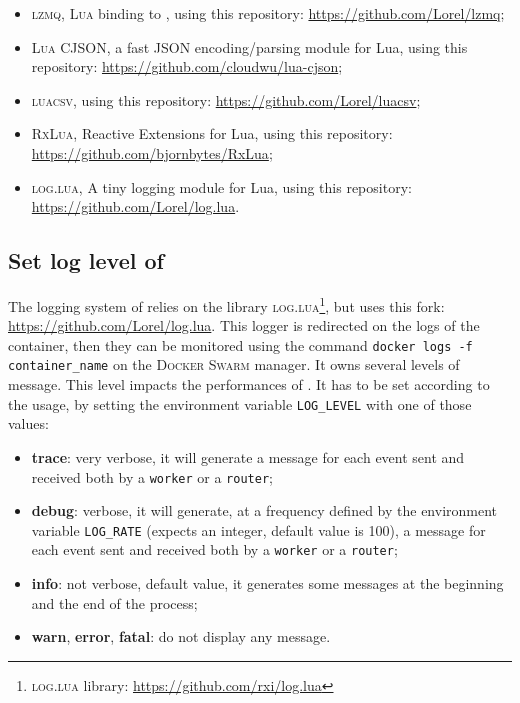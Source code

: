 \begin{itemize}
  \item \textsc{lzmq}, \textsc{Lua} binding to \zmq{}, using this repository: \url{https://github.com/Lorel/lzmq};
  \item \textsc{Lua CJSON}, a fast \textsc{JSON} encoding/parsing module for Lua, using this repository: \url{https://github.com/cloudwu/lua-cjson};
  \item \textsc{luacsv}, using this repository: \url{https://github.com/Lorel/luacsv};
  \item \textsc{RxLua}, Reactive Extensions for Lua, using this repository: \url{https://github.com/bjornbytes/RxLua};
  \item \textsc{log.lua}, A tiny logging module for Lua, using this repository: \url{https://github.com/Lorel/log.lua}.
\end{itemize}

\subsection{Set log level of \SS{}}
\label{subsec:ss-log-level}

The logging system of \SS{} relies on the library \textsc{log.lua}\footnote{\textsc{log.lua} library: \url{https://github.com/rxi/log.lua}}, but uses this fork: \url{https://github.com/Lorel/log.lua}.
This logger is redirected on the logs of the container, then they can be monitored using the command \texttt{docker logs -f container\_name} on the \textsc{Docker Swarm} manager.
It owns several levels of message.
This level impacts the performances of \SS{}.
It has to be set according to the usage, by setting the environment variable \texttt{LOG\_LEVEL} with one of those values:

\begin{itemize}
  \item \textbf{trace}: very verbose, it will generate a message for each event sent and received both by a \texttt{worker} or a \texttt{router};
  \item \textbf{debug}: verbose, it will generate, at a frequency defined by the environment variable \texttt{LOG\_RATE} (expects an integer, default value is 100), a message for each event sent and received both by a \texttt{worker} or a \texttt{router};
  \item \textbf{info}: not verbose, default value, it generates some messages at the beginning and the end of the process;
  \item \textbf{warn}, \textbf{error}, \textbf{fatal}: do not display any message.
\end{itemize}
